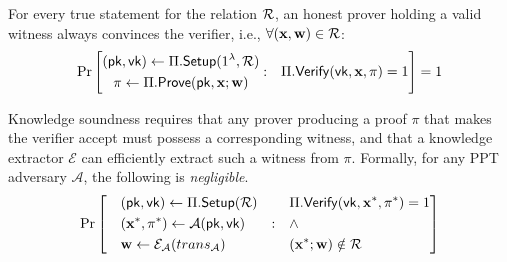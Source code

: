 \documentclass[letterpaper,twocolumn,10pt]{article}
\begin{document}
 For every true statement for the relation ${\mathcal{R}}$, an honest prover holding a valid witness always convinces the verifier, i.e., $\forall({\mathbf{x}}, {\mathbf{w}}) \in {\mathcal{R}}$:
    \begin{equation*}
        \Pr\left[
        \begin{matrix}
            \begin{gathered}
                ({\sf pk}, {\sf vk}) \gets \Pi.{\sf Setup}(1^\lambda, {\mathcal{R}}) \\
                \pi \gets \Pi.{\sf Prove}({\sf pk}, {\mathbf{x}}; {\mathbf{w}})
            \end{gathered} 
            : & 
            \begin{gathered}
                \Pi.{\sf Verify}({\sf vk}, {\mathbf{x}}, \pi) =1
            \end{gathered}
        \end{matrix}
        \right] = 1
    \end{equation*}

 Knowledge soundness requires that any prover producing a proof $\pi$ that makes the verifier accept must possess a corresponding witness, and that a knowledge extractor $\mathcal{E}$ can efficiently extract such a witness from $\pi$. Formally, for any PPT adversary $\mathcal{A}$, the following is \textit{negligible}.
\begin{equation*}
\Pr\left[
\begin{aligned}
     \quad & ({\sf pk}, {\sf vk}) \gets \Pi.{\sf Setup}({\mathcal{R}}) & & \Pi.{\sf Verify}({\sf vk}, {\mathbf{x}}^*, \pi^*) = 1\\
     &  ({\mathbf{x}}^*, \pi^*) \gets {\mathcal{A}}({\sf pk}, {\sf vk}) &:\quad & \wedge \\
     & {\mathbf{w}} \gets {\mathcal{E}}_{\mathcal{A}}(trans_{\mathcal{A}}) & & ({\mathbf{x}}^*; {\mathbf{w}}) \notin {\mathcal{R}} \quad \quad
\end{aligned}
\right]
\end{equation*}
\end{document}
